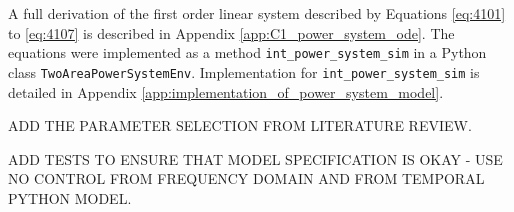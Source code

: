 A full derivation of the first order linear system described by Equations \ref{eq:4101} to \ref{eq:4107} is described in Appendix \ref{app:C1_power_system_ode}. The equations were implemented as a method \verb|int_power_system_sim| in a Python class \verb|TwoAreaPowerSystemEnv|. Implementation for \verb|int_power_system_sim| is detailed in Appendix \ref{app:implementation_of_power_system_model}.

ADD THE PARAMETER SELECTION FROM LITERATURE REVIEW.

ADD TESTS TO ENSURE THAT MODEL SPECIFICATION IS OKAY - USE NO CONTROL FROM FREQUENCY DOMAIN AND FROM TEMPORAL PYTHON MODEL.
